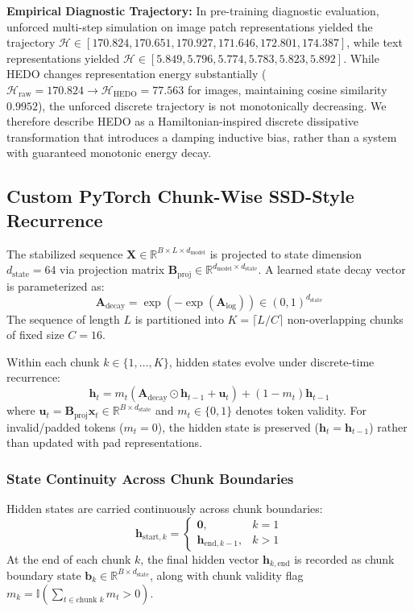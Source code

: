 \documentclass[pdflatex,sn-mathphys-num]{sn-jnl}%
\begin{document}
\textbf{Empirical Diagnostic Trajectory:} In pre-training diagnostic evaluation, unforced multi-step simulation on image patch representations yielded the trajectory $\mathcal{H} \in [170.824, 170.651, 170.927, 171.646, 172.801, 174.387]$, while text representations yielded $\mathcal{H} \in [5.849, 5.796, 5.774, 5.783, 5.823, 5.892]$. While HEDO changes representation energy substantially ($\mathcal{H}_{\text{raw}} = 170.824 \to \mathcal{H}_{\text{HEDO}} = 77.563$ for images, maintaining cosine similarity $0.9952$), the unforced discrete trajectory is not monotonically decreasing. We therefore describe HEDO as a Hamiltonian-inspired discrete dissipative transformation that introduces a damping inductive bias, rather than a system with guaranteed monotonic energy decay.

\subsection{Custom PyTorch Chunk-Wise SSD-Style Recurrence}
The stabilized sequence $\mathbf{X} \in \mathbb{R}^{B \times L \times d_{\text{model}}}$ is projected to state dimension $d_{\text{state}} = 64$ via projection matrix $\mathbf{B}_{\text{proj}} \in \mathbb{R}^{d_{\text{model}} \times d_{\text{state}}}$. A learned state decay vector is parameterized as:
\begin{equation}
\mathbf{A}_{\text{decay}} = \exp(-\exp(\mathbf{A}_{\text{log}})) \in (0, 1)^{d_{\text{state}}} \label{eq:adecay}
\end{equation}
The sequence of length $L$ is partitioned into $K = \lceil L / C \rceil$ non-overlapping chunks of fixed size $C = 16$.

Within each chunk $k \in \{1, \dots, K\}$, hidden states evolve under discrete-time recurrence:
\begin{equation}
\mathbf{h}_{t} = m_t \left( \mathbf{A}_{\text{decay}} \odot \mathbf{h}_{t-1} + \mathbf{u}_t \right) + (1 - m_t) \mathbf{h}_{t-1}
\end{equation}
where $\mathbf{u}_t = \mathbf{B}_{\text{proj}} \mathbf{x}_t \in \mathbb{R}^{B \times d_{\text{state}}}$ and $m_t \in \{0, 1\}$ denotes token validity. For invalid/padded tokens ($m_t = 0$), the hidden state is preserved ($\mathbf{h}_t = \mathbf{h}_{t-1}$) rather than updated with pad representations.

\subsubsection{State Continuity Across Chunk Boundaries}
Hidden states are carried continuously across chunk boundaries:
\begin{equation}
\mathbf{h}_{\text{start}, k} = \begin{cases} \mathbf{0}, & k = 1 \\ \mathbf{h}_{\text{end}, k-1}, & k > 1 \end{cases} \label{eq:state_cont}
\end{equation}
At the end of each chunk $k$, the final hidden vector $\mathbf{h}_{k, \text{end}}$ is recorded as chunk boundary state $\mathbf{b}_k \in \mathbb{R}^{B \times d_{\text{state}}}$, along with chunk validity flag $m_k = \mathbb{I}(\sum_{t \in \text{chunk } k} m_t > 0)$.
\end{document}
